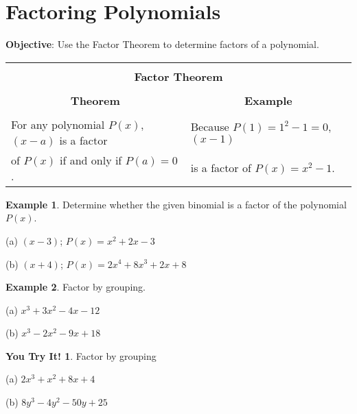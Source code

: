 \documentclass{report}
\theoremstyle{definition}
\newtheorem{example}{\bf Example}
\newtheorem{youtry}{\bf You Try It!}
\begin{document}
 \section{Factoring Polynomials}
 \indent\hfill\small\noindent \textbf{Objective}:  Use the Factor Theorem to determine factors of a polynomial. \normalsize\\
 \setcounter{example}{0}
 \setcounter{definition}{0}
 
 \begin{center}
	\begin{tabular}{|l|l|}
		\hline
		\multicolumn{2}{|c|}{}\\
		\multicolumn{2}{|c|}{\large\textbf{Factor Theorem}\normalsize}\\ 
		\hline
		&\\
		\multicolumn{1}{|c|}{\textbf{Theorem}} & \multicolumn{1}{c|}{\textbf{Example}}\\
		\hline
		&\\
		For any polynomial $P(x)$, $(x-a)$ is a factor & Because $P(1)=1^2-1=0$, $(x-1)$\\
		of $P(x)$ if and only if $P(a)=0$. & is a factor of $P(x)=x^2-1$.\\
		\hline
	\end{tabular}
\end{center}
 
\begin{example}
 Determine whether the given binomial is a factor of the polynomial $P(x)$.
\end{example}
\begin{minipage}[t]{0.45\linewidth}
 (a) $(x-3)$; $P(x)=x^2+2x-3$
\end{minipage}
\begin{minipage}[t]{0.45\linewidth}
 (b) $(x+4)$; $P(x)=2x^4+8x^3+2x+8$
\end{minipage}
\vfill

\begin{example}
Factor by grouping.
\end{example}
\begin{minipage}[t]{0.45\linewidth}
 (a) $x^3+3x^2-4x-12$
\end{minipage}
\begin{minipage}[t]{0.45\linewidth}
 (b) $x^3-2x^2-9x+18$
\end{minipage}
\vfill
\begin{youtry}
Factor by grouping
\end{youtry}
\begin{minipage}[t]{0.45\linewidth}
 (a) $2x^3+x^2+8x+4$
\end{minipage}
\begin{minipage}[t]{0.45\linewidth}
 (b) $8y^3-4y^2-50y+25$
\end{minipage}
\vfill
\end{document}
